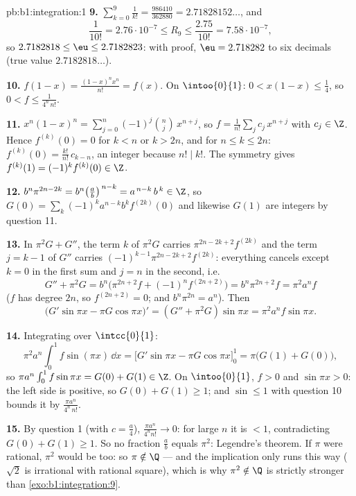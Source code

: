 \begin{solution}{pb:b1:integration:1}
\textbf{9.} $\sum_{k=0}^{9} \frac{1}{k!} = \frac{986410}{362880}
= 2.71828152\dots$, and
\[
\frac{1}{10!} = 2.76\cdot10^{-7} \leq R_9 \leq
\frac{2.75}{10!} = 7.58\cdot10^{-7} ,
\]
so $2.7182818 \leq \eu \leq 2.7182823$: with proof, $\eu =
2.718282$ to six decimals (true value $2.7182818\dots$).

\textbf{10.} $f(1 - x) = \frac{(1-x)^n x^n}{n!} = f(x)$. On
$\intoo{0}{1}$: $0 < x(1-x) \leq \frac14$, so $0 < f \leq
\frac{1}{4^n\,n!}$.

\textbf{11.} $x^n(1-x)^n = \sum_{j=0}^{n} (-1)^j\binom
nj\,x^{n+j}$, so $f = \frac{1}{n!}\sum_j c_j\,x^{n+j}$ with
$c_j \in \Z$. Hence $f^{(k)}(0) = 0$ for $k < n$ or $k > 2n$,
and for $n \leq k \leq 2n$: $f^{(k)}(0) = \frac{k!}{n!}\,
c_{k-n}$, an integer because $n! \mid k!$. The symmetry gives
$f^{(k)}(1) = (-1)^k f^{(k)}(0) \in \Z$.

\textbf{12.} $b^n \pi^{2n-2k} = b^n\bigl(\frac
ab\bigr)^{\,n-k} = a^{\,n-k}\,b^{\,k} \in \Z$, so $G(0) =
\sum_k (-1)^k a^{n-k} b^k f^{(2k)}(0)$ and likewise $G(1)$ are
integers by question 11.

\textbf{13.} In $\pi^2 G + G''$, the term $k$ of $\pi^2 G$
carries $\pi^{2n-2k+2}f^{(2k)}$ and the term $j = k - 1$ of
$G''$ carries $(-1)^{k-1}\pi^{2n-2k+2}f^{(2k)}$: everything
cancels except $k = 0$ in the first sum and $j = n$ in the
second, i.e.
\[
G'' + \pi^2 G = b^n\bigl(\pi^{2n+2} f + (-1)^n f^{(2n+2)}\bigr)
= b^n \pi^{2n+2} f = \pi^2 a^n f
\]
($f$ has degree $2n$, so $f^{(2n+2)} = 0$; and $b^n\pi^{2n} =
a^n$). Then
\[
\bigl(G'\sin\pi x - \pi G\cos\pi x\bigr)'
= (G'' + \pi^2 G)\sin \pi x = \pi^2 a^n f\sin\pi x .
\]

\textbf{14.} Integrating over $\intcc{0}{1}$:
\[
\pi^2 a^n \int_0^1 f\sin(\pi x)\,\dd x
= \bigl[G'\sin\pi x - \pi G\cos\pi x\bigr]_0^1
= \pi\bigl(G(1) + G(0)\bigr) ,
\]
so $\pi a^n \int_0^1 f\sin\pi x = G(0) + G(1) \in \Z$. On
$\intoo{0}{1}$, $f > 0$ and $\sin\pi x > 0$: the left side is
positive, so $G(0) + G(1) \geq 1$; and $\sin \leq 1$ with
question 10 bounds it by $\frac{\pi a^n}{4^n\,n!}$.

\textbf{15.} By question 1 (with $c = \frac a4$),
$\frac{\pi a^n}{4^n n!} \to 0$: for large $n$ it is $< 1$,
contradicting $G(0) + G(1) \geq 1$. So no fraction $\frac ab$
equals $\pi^2$: Legendre's theorem. If $\pi$ were rational,
$\pi^2$ would be too: so $\pi \notin \Q$ --- and the implication
only runs this way ($\sqrt2$ is irrational with rational
square), which is why $\pi^2 \notin \Q$ is strictly stronger
than \cref{exo:b1:integration:9}.


\end{solution}
